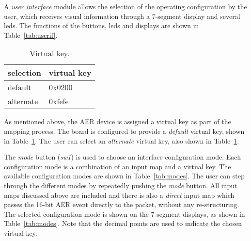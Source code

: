 A \emph{user interface} module allows the selection of the operating
configuration by the user, which receives visual information through a
7-segment display and several leds. The functions of the buttons, leds
and displays are shown in Table~\ref{tab:userif}.\\


\begin{table}[!hp]
\begin{center}
\begin{tabular}{| l | l |}
\hline
\multicolumn{1}{|c}{selection} & \multicolumn{1}{|c|}{virtual key} \\
\hline
default   &  0x0200 \\
alternate &  0xfefe \\
\hline
\end{tabular}
\caption{Virtual key.}
\label{tab:addrs}
\end{center}
\end{table}


As mentioned above, the AER device is assigned a virtual key as part
of the mapping process. The board is configured to provide
a \emph{default} virtual key, shown in Table~\ref{tab:addrs}. The user
can select an \emph{alternate} virtual key, also shown in
Table~\ref{tab:addrs}.

The \emph {mode} button (\emph{sw1}) is used to choose an interface
configuration mode. Each configuration mode is a combination of an
input map and a virtual key. The available configuration modes are
shown in Table~\ref{tab:modes}. The user can step through the
different modes by repeatedly pushing the \emph{mode} button. All
input maps discussed above are included and there is also
a \emph{direct} input map which passes the 16-bit AER event directly
to the packet, without any re-structuring. The selected configuration
mode is shown on the 7 segment displays, as shown in
Table~\ref{tab:modes}. Note that the decimal points are used to
indicate the chosen virtual key.


